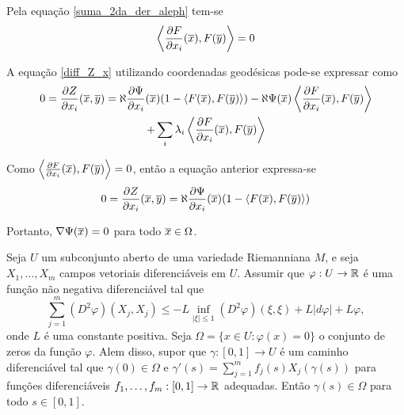 \begin{demonstracao}
	Pela equação \eqref{suma_2da_der_aleph} tem-se
	\begin{equation*}
		\left\langle \frac{\partial F}{\partial x_i}(\overline{x}), F(\overline{y}) \right\rangle = 0
	\end{equation*}
	
	A equação \eqref{diff_Z_x} utilizando coordenadas geodésicas pode-se expressar como
	\begin{multline*}
		0 = \frac{\partial Z}{\partial x_i}(\overline{x},\overline{y}) = \aleph \frac{\partial \Psi}{\partial x_i}(\overline{x})(1 - \langle F(\overline{x}),F(\overline{y}) \rangle)  - \aleph \Psi(\overline{x}) \left\langle \frac{\partial F}{\partial x_i}(\overline{x}), F(\overline{y}) \right\rangle\\
		+ \sum_i \lambda_i \left\langle \frac{\partial F}{\partial x_i}(\overline{x}),F(\overline{y}) \right\rangle
	\end{multline*}
	
	Como $\left\langle \frac{\partial F}{\partial x_i}(\overline{x}),F(\overline{y}) \right\rangle = 0$, então a equação anterior expressa-se
	\begin{equation*}
		0 = \frac{\partial Z}{\partial x_i}(\overline{x},\overline{y}) = \aleph \frac{\partial \Psi}{\partial x_i}(\overline{x})(1 - \langle F(\overline{x}),F(\overline{y}) \rangle)
	\end{equation*}
	
	Portanto, $\nabla \Psi(\overline{x}) = 0$ para todo $\overline{x} \in \Omega$.
\end{demonstracao}

\begin{lema}\label{bony}
	Seja $U$ um subconjunto aberto de uma variedade Riemanniana $M$, e seja $X_1, \ldots, X_m$ campos vetoriais diferenciáveis em $U$. Assumir que $\varphi: U \rightarrow \mathbb{R}$ é uma função não negativa diferenciável tal que
	\begin{equation*}
		\sum_{j=1}^{m} (D^2 \varphi)(X_j,X_j) \leq -L \inf_{|\xi| \leq 1} (D^2 \varphi)(\xi,\xi) + L |d \varphi| + L \varphi,
	\end{equation*}
	onde $L$ é uma constante positiva. Seja $\Omega = \{ x \in U: \varphi(x) = 0 \}$ o conjunto de zeros da função $\varphi$. Alem disso, supor que $\gamma: [0,1] \rightarrow U$ é um caminho diferenciável tal que $\gamma(0) \in \Omega$ e $\gamma'(s) = \sum_{j=1}^{m} f_j(s) X_j(\gamma(s))$ para funções diferenciáveis $f_1, \ldots, f_m: [0,1] \rightarrow \mathbb{R}$ adequadas. Então $\gamma(s) \in \Omega$ para todo $s \in [0,1]$.
\end{lema}


